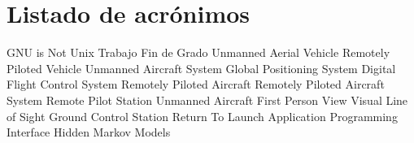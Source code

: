 \chapter{Listado de acrónimos}

{\small
\begin{acronym}[TFG]
       {\acs{GNU} is Not Unix}
       {Trabajo Fin de Grado}
       {Unmanned Aerial Vehicle}
       {Remotely Piloted Vehicle}
       {Unmanned Aircraft System}
       {Global Positioning System}
      {Digital Flight Control System}
       {Remotely Piloted Aircraft}
      {Remotely Piloted Aircraft System}
       {Remote Pilot Station}
        {Unmanned Aircraft} 
       {First Person View}
      {Visual Line of Sight} 
       {Ground Control Station}
       {Return To Launch}
       {Application Programming Interface}
       {Hidden Markov Models}
\end{acronym}
}




